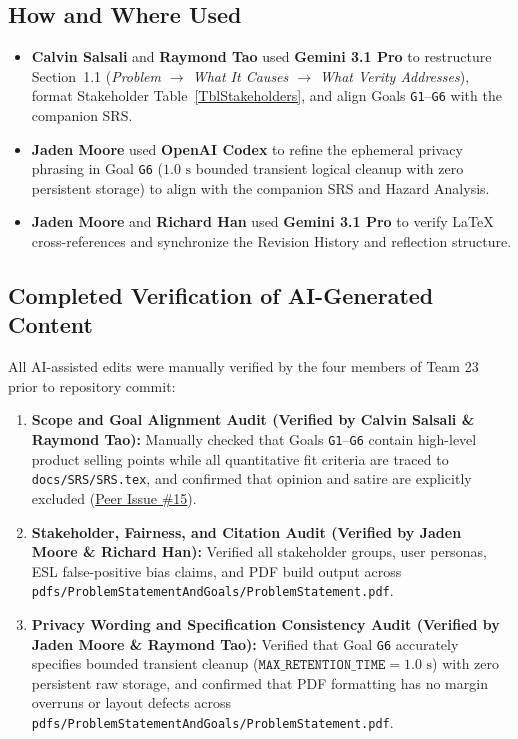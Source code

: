 \documentclass[11pt]{article}
\begin{document}
\subsection*{How and Where Used}
\begin{itemize}[leftmargin=*]
    \item \textbf{Calvin Salsali} and \textbf{Raymond Tao} used \textbf{Gemini 3.1 Pro} to restructure Section~1.1 (\emph{Problem $\to$ What It Causes $\to$ What Verity Addresses}), format Stakeholder Table~\ref{TblStakeholders}, and align Goals \texttt{G1}--\texttt{G6} with the companion SRS.
    \item \textbf{Jaden Moore} used \textbf{OpenAI Codex} to refine the ephemeral privacy phrasing in Goal \texttt{G6} ($1.0\text{ s}$ bounded transient logical cleanup with zero persistent storage) to align with the companion SRS and Hazard Analysis.
    \item \textbf{Jaden Moore} and \textbf{Richard Han} used \textbf{Gemini 3.1 Pro} to verify \LaTeX{} cross-references and synchronize the Revision History and reflection structure.
\end{itemize}

\subsection*{Completed Verification of AI-Generated Content}
All AI-assisted edits were manually verified by the four members of Team 23 prior to repository commit:
\begin{enumerate}[leftmargin=*]
    \item \textbf{Scope and Goal Alignment Audit (Verified by Calvin Salsali \& Raymond Tao):} Manually checked that Goals \texttt{G1}--\texttt{G6} contain high-level product selling points while all quantitative fit criteria are traced to \texttt{docs/SRS/SRS.tex}, and confirmed that opinion and satire are explicitly excluded (\href{https://github.com/richy1337/Verity/issues/15}{Peer Issue \#15}).
    \item \textbf{Stakeholder, Fairness, and Citation Audit (Verified by Jaden Moore \& Richard Han):} Verified all stakeholder groups, user personas, ESL false-positive bias claims, and PDF build output across \texttt{pdfs/ProblemStatementAndGoals/ProblemStatement.pdf}.
    \item \textbf{Privacy Wording and Specification Consistency Audit (Verified by Jaden Moore \& Raymond Tao):} Verified that Goal \texttt{G6} accurately specifies bounded transient cleanup ($\texttt{MAX\_RETENTION\_TIME} = 1.0\text{ s}$) with zero persistent raw storage, and confirmed that PDF formatting has no margin overruns or layout defects across \texttt{pdfs/\allowbreak{}ProblemStatementAndGoals/\allowbreak{}ProblemStatement.pdf}.
\end{enumerate}
\end{document}
